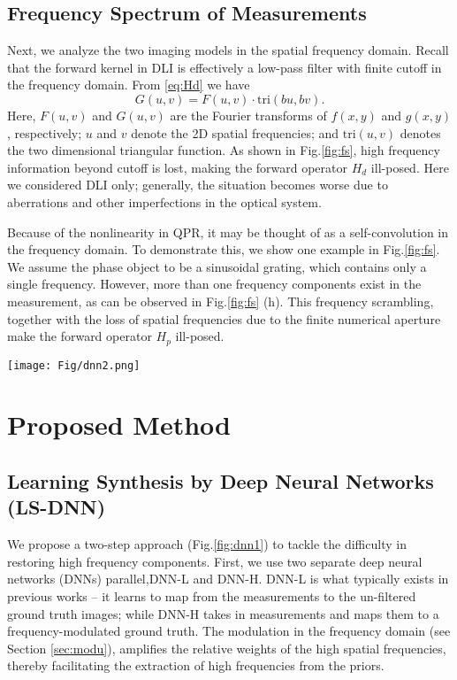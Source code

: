 \documentclass[10pt,twocolumn,letterpaper]{article}
\begin{document}
\subsection{Frequency Spectrum of Measurements}
Next, we analyze the two imaging models in the spatial frequency domain. Recall that the forward kernel in DLI is effectively a low-pass filter with finite cutoff in the frequency domain. From \ref{eq:Hd} we have
\begin{equation}
G(u,v)=F(u,v)\cdot \text{tri}(bu,bv).
\label{eq:fd}
\end{equation}
Here, $F(u,v)$ and $G(u,v)$ are the Fourier transforms of $f(x,y)$ and $g(x,y)$, respectively; $u$ and $v$ denote the 2D spatial frequencies; and $\text{tri}(u,v)$ denotes the two dimensional triangular function. As shown in Fig.\ref{fig:fs}, high frequency information beyond cutoff is lost, making the forward operator $H_{d}$ ill-posed. Here we considered DLI only; generally, the situation becomes worse due to aberrations and other imperfections in the optical system.

Because of the nonlinearity in QPR, it may be thought of as a self-convolution in the frequency domain. To demonstrate this, we show one example in Fig.\ref{fig:fs}. We assume the phase object to be a sinusoidal grating, which contains only a single frequency. However, more than one frequency components exist in the measurement, as can be observed in Fig.\ref{fig:fs} (h). This frequency scrambling, together with the loss of spatial frequencies due to the finite numerical aperture make the forward operator $H_{p}$ ill-posed. 



\begin{figure*}[h]
\centering\texttt{[image: Fig/dnn2.png]}
\caption{Proposed LS-DNN.}
\label{fig:dnn1}
\end{figure*}

\section{Proposed Method}
\subsection{Learning Synthesis by Deep Neural Networks (LS-DNN)}
We propose a two-step approach (Fig.\ref{fig:dnn1}) to tackle the difficulty in restoring high frequency components. First, we use two separate deep neural networks (DNNs)  parallel,DNN-L and DNN-H. DNN-L is what typically exists in previous works -- it learns to map from the measurements to the un-filtered ground truth images; while DNN-H takes in measurements and maps them to a frequency-modulated ground truth. The modulation in the frequency domain (see Section \ref{sec:modu}), amplifies the relative weights of the high spatial frequencies, thereby facilitating the extraction of high frequencies from the priors.
\end{document}
